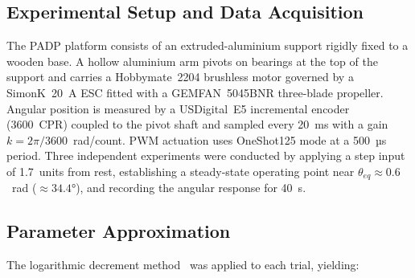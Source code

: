 \documentclass[conference]{IEEEtran}
\begin{document}
\subsection{Experimental Setup and Data Acquisition}
The PADP platform consists of an extruded-aluminium support rigidly fixed to a wooden base. A hollow aluminium arm pivots on bearings at the top of the support and carries a Hobbymate~2204 brushless motor governed by a SimonK~20~A ESC fitted with a GEMFAN~5045BNR three-blade propeller. Angular position is measured by a USDigital~E5 incremental encoder (3600~CPR) coupled to the pivot shaft and sampled every 20~ms with a gain $k = 2\pi/3600$~rad/count. PWM actuation uses OneShot125 mode at a 500~µs period. Three independent experiments were conducted by applying a step input of 1.7~units from rest, establishing a steady-state operating point near $\theta_{eq} \approx 0.6$~rad ($\approx 34.4°$), and recording the angular response for 40~s.


\subsection{Parameter Approximation}
The logarithmic decrement method~\cite{ogata2010} was
applied to each trial, yielding:
\end{document}
